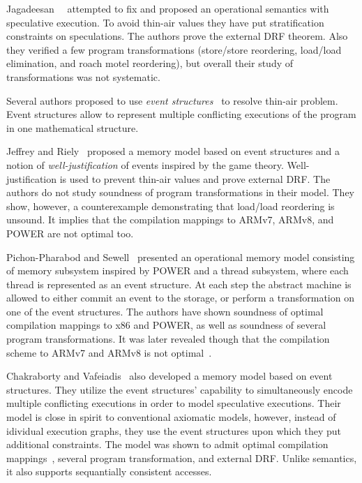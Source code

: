 Jagadeesan~\etal~\cite{Jagadeesan-al:ESOP10} attempted to fix \JMM 
and proposed an operational semantics with speculative execution.
To avoid thin-air values they have put stratification constraints 
on speculations. The authors prove the external DRF theorem. 
Also they verified a few program transformations 
(store/store reordering, load/load elimination, and roach motel reordering), 
but overall their study of transformations was not systematic.  

Several authors proposed to use \emph{event structures}~\cite{Winskel:86}
to resolve thin-air problem. Event structures allow to represent 
multiple conflicting executions of the program in one mathematical structure.  

Jeffrey and Riely~\cite{Jeffrey-Riely:LICS16} proposed 
a memory model based on event structures and a notion of 
\emph{well-justification} of events inspired by the game theory. 
Well-justification is used to prevent thin-air values 
and prove external DRF. The authors do not study 
soundness of program transformations in their model. 
They show, however, a counterexample demonstrating that 
load/load reordering is unsound. It implies that 
the compilation mappings to ARMv7, ARMv8, and POWER 
are not optimal too.   

Pichon-Pharabod and Sewell~\cite{PichonPharabod-Sewell:POPL16} 
presented an operational memory model consisting of 
memory subsystem inspired by POWER and a thread subsystem, 
where each thread is represented as an event structure. 
At each step the abstract machine is allowed to either 
commit an event to the storage, or perform a transformation 
on one of the event structures. 
The authors have shown soundness of 
optimal compilation mappings to x86 and POWER, 
as well as soundness of several program transformations.
It was later revealed though that the compilation scheme
to ARMv7 and ARMv8 is not optimal~\cite{PichonPharabod:PhD18}.

Chakraborty and Vafeiadis~\cite{Chakraborty-Vafeiadis:POPL19}
also developed a memory model based on event structures. 
They utilize the event structures' capability to simultaneously encode 
multiple conflicting executions in order to model speculative executions.
Their model is close in spirit to conventional axiomatic models, 
however, instead of idividual execution graphs, they use 
the event structures upon which they put additional constraints. 
The model was shown to admit optimal compilation mappings~\cite{Moiseenko-al:ECOOP20},
several program transformation, and external DRF.
Unlike \Promising semantics, it also supports 
sequantially consistent accesses.

